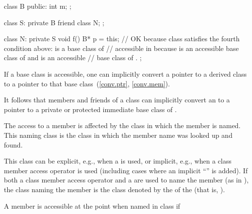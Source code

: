 \begin{example}
\begin{codeblock}
class B {
public:
  int m;
};

class S: private B {
  friend class N;
};

class N: private S {
  void f() {
    B* p = this;    // OK because class  satisfies the fourth condition above:  is a base class of 
                    // accessible in  because  is an accessible base class of  and  is an accessible
                    // base class of .
  }
};
\end{codeblock}
\end{example}

\pnum
If a base class is accessible, one can implicitly convert a pointer to
a derived class to a pointer to that base class~(\ref{conv.ptr}, \ref{conv.mem}).
\begin{note}
It follows that
members and friends of a class
can implicitly convert an
to a pointer to a private or protected immediate base class of
.
\end{note}
The access to a member is affected by the class in which the member is
named.
This naming class is the class in which the member name was looked
up and found.
\begin{note}
This class can be explicit, e.g., when a
is used, or implicit, e.g., when a class member access operator is used (including cases where an implicit
``''
is
added).
If both a class member access operator and a
are used to name the member (as in
),
the class naming the member is the class denoted by the
of the
(that is,
).
\end{note}
A member
is accessible at the point
when named in class
if
